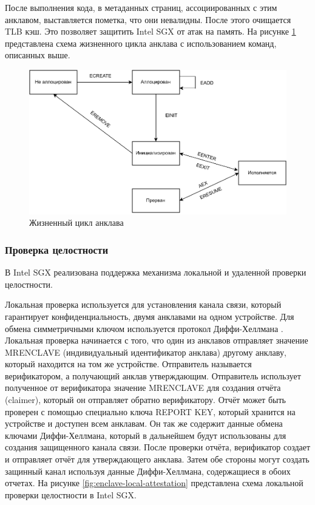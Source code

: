 После выполнения кода, в метаданных страниц, ассоциированных с этим анклавом, выставляется пометка, что они невалидны. После этого очищается TLB кэш. Это позволяет защитить Intel SGX от атак на память. На рисунке \ref{fig:enclave-life} представлена схема жизненного цикла анклава с использованием команд, описанных выше.

\begin{figure}[h]
	\centering
	\includegraphics[width=\textwidth]{img/enclave-life-cycle.pdf}
	\caption{Жизненный цикл анклава}
	\label{fig:enclave-life}
\end{figure}

\subsubsection{Проверка целостности}

В Intel SGX реализована поддержка механизма локальной и удаленной  проверки целостности. 

Локальная проверка используется для установления канала связи, который гарантирует конфиденциальность, двумя анклавами на одном устройстве. Для обмена симметричными ключом используется протокол  Диффи-Хеллмана \cite{dh-ke}. Локальная проверка начинается с того, что один из анклавов отправляет значение MRENCLAVE (индивидуальный идентификатор анклава) другому анклаву, который находится на том же устройстве. Отправитель называется верификатором, а получающий анклав утверждающим. Отправитель использует полученное от верификатора значение MRENCLAVE для создания отчёта (claimer), который он отправляет обратно верификатору. Отчёт может быть проверен с помощью специально ключа REPORT KEY, который хранится на устройстве и доступен всем анклавам. Он так же содержит данные обмена ключами Диффи-Хеллмана, который в дальнейшем будут использованы для создания защищенного канала связи. После проверки отчёта, верификатор создает и отправляет отчёт для утверждающего анклава. Затем обе стороны могут создать защинный канал используя данные Диффи-Хеллмана, содержащиеся в обоих отчетах. На рисунке \ref{fig:enclave-local-attestation} представлена схема локальной проверки целостности в Intel SGX.


